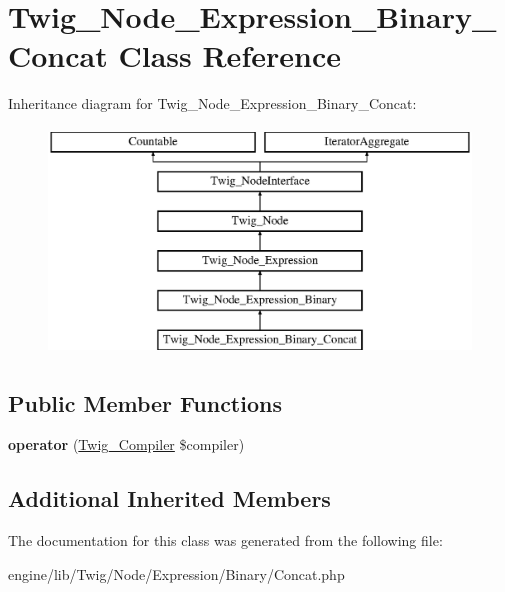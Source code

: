 \hypertarget{class_twig___node___expression___binary___concat}{}\section{Twig\+\_\+\+Node\+\_\+\+Expression\+\_\+\+Binary\+\_\+\+Concat Class Reference}
\label{class_twig___node___expression___binary___concat}
Inheritance diagram for Twig\+\_\+\+Node\+\_\+\+Expression\+\_\+\+Binary\+\_\+\+Concat\+:\begin{figure}[H]
\begin{center}
\leavevmode
\includegraphics[height=6.000000cm]{class_twig___node___expression___binary___concat}
\end{center}
\end{figure}
\subsection*{Public Member Functions}
\begin{DoxyCompactItemize}
\item 
\hypertarget{class_twig___node___expression___binary___concat_af77318ec88d5f8a508684970a150b670}{}{\bfseries operator} (\hyperlink{class_twig___compiler}{Twig\+\_\+\+Compiler} \$compiler)\label{class_twig___node___expression___binary___concat_af77318ec88d5f8a508684970a150b670}

\end{DoxyCompactItemize}
\subsection*{Additional Inherited Members}


The documentation for this class was generated from the following file\+:\begin{DoxyCompactItemize}
\item 
engine/lib/\+Twig/\+Node/\+Expression/\+Binary/Concat.\+php\end{DoxyCompactItemize}

